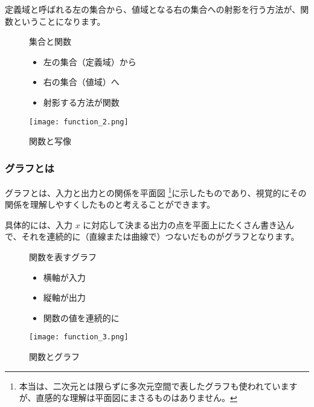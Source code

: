 \documentclass[uplatex,dvipdfmx,a4paper,11pt]{jsreport}
\begin{document}
定義域と呼ばれる左の集合から、値域となる右の集合への射影を行う方法が、関数ということになります。
\begin{figure}[htb]
	\begin{center}
		\begin{minipage}{0.45\textwidth}
			\large
			\begin{itembox}[l]{集合と関数}
				\begin{itemize}
					\item 左の集合（定義域）から
					\item 右の集合（値域）へ
					\item 射影する方法が関数
				\end{itemize}
			\end{itembox}
		\end{minipage}
		\begin{minipage}{0.45\textwidth}
			\begin{center}
			\texttt{[image: function\_2.png]}
			\end{center}
		\end{minipage}
		\caption{関数と写像}
		\label{function_2}
	\end{center}
\end{figure}

\subsubsection{グラフとは}
グラフとは、入力と出力との関係を平面図
\footnote{
	本当は、二次元とは限らずに多次元空間で表したグラフも使われていますが、直感的な理解は平面図にまさるものはありません。
}に示したものであり、視覚的にその関係を理解しやすくしたものと考えることができます。

具体的には、入力 $x$ に対応して決まる出力の点を平面上にたくさん書き込んで、それを連続的に（直線または曲線で）つないだものがグラフとなります。
\begin{figure}[htb]
	\begin{center}
		\begin{minipage}{0.45\textwidth}
			\large
			\begin{itembox}[l]{関数を表すグラフ}
				\begin{itemize}
					\item 横軸が入力
					\item 縦軸が出力
					\item 関数の値を連続的に
				\end{itemize}
			\end{itembox}
		\end{minipage}
		\begin{minipage}{0.45\textwidth}
			\begin{center}
			\texttt{[image: function\_3.png]}
			\end{center}
		\end{minipage}
		\caption{関数とグラフ}
		\label{function_3}
	\end{center}
\end{figure}
\end{document}
